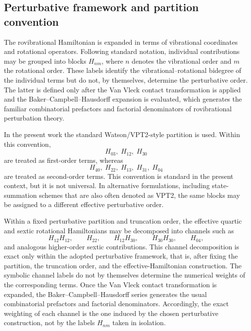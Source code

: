 \subsection{Perturbative framework and partition convention}

The rovibrational Hamiltonian is expanded in terms of vibrational
coordinates and rotational operators. Following standard notation,
individual contributions may be grouped into blocks $H_{nm}$, where
$n$ denotes the vibrational order and $m$ the rotational order.
These labels identify the vibrational--rotational bidegree of the
individual terms but do not, by themselves, determine the perturbative
order. The latter is defined only after the Van Vleck contact
transformation is applied and the Baker--Campbell--Hausdorff expansion
is evaluated, which generates the familiar combinatorial prefactors
and factorial denominators of rovibrational perturbation
theory.\cite{Watson1967,Watson1968,Watson1968JCP,AlievWatson1976}

In the present work the standard Watson/VPT2-style partition is used.
Within this convention,
\begin{equation}
H_{03},\; H_{12},\; H_{30}
\end{equation}
are treated as first-order terms, whereas
\begin{equation}
H_{40},\; H_{22},\; H_{13},\; H_{31},\; H_{04}
\end{equation}
are treated as second-order terms. This convention is standard in the
present context, but it is not universal. In alternative formulations,
including state-summation schemes that are also often denoted as VPT2,
the same blocks may be assigned to a different effective perturbative
order.\cite{Franke2023}

Within a fixed perturbative partition and truncation order, the
effective quartic and sextic rotational Hamiltonians may be decomposed
into channels such as
\begin{equation}
H_{12}H_{12},\qquad H_{22},\qquad H_{12}H_{30},\qquad
H_{30}H_{30},\qquad H_{04},
\end{equation}
and analogous higher-order sextic contributions. This channel
decomposition is exact only within the adopted perturbative framework,
that is, after fixing the partition, the truncation order, and the
effective-Hamiltonian construction. The symbolic channel labels do not
by themselves determine the numerical weights of the corresponding
terms. Once the Van Vleck contact transformation is expanded, the
Baker--Campbell--Hausdorff series generates the usual combinatorial
prefactors and factorial denominators. Accordingly, the exact
weighting of each channel is the one induced by the chosen
perturbative construction, not by the labels $H_{nm}$ taken in
isolation.

